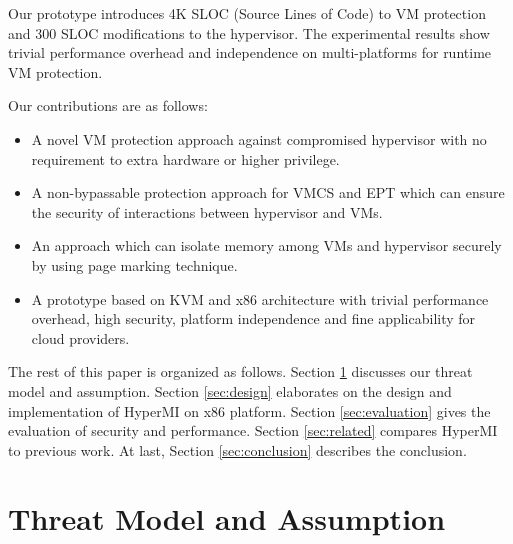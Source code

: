 \documentclass[conference]{IEEEtran}
\begin{document}
Our prototype introduces 4K SLOC (Source Lines of Code) to VM protection and 300 SLOC modifications to the hypervisor.
The experimental results show trivial performance overhead and independence on multi-platforms for runtime VM protection. 


Our contributions are as follows:
\begin{itemize}
\item{A novel VM protection approach against compromised hypervisor with no requirement to extra hardware or higher privilege.} 

\item{A non-bypassable protection approach for VMCS and EPT which can ensure the security of interactions between hypervisor and VMs.}
\item{An approach which can isolate memory among VMs and hypervisor securely by using page marking technique.}%

\item{A prototype based on KVM and x86 architecture with trivial performance overhead, high security, platform independence and fine applicability  for cloud providers.}

\end{itemize}
The rest of this paper is organized as follows. Section \ref{sec:threat} discusses our threat model and assumption. Section \ref{sec:design} elaborates on the design and implementation of HyperMI on x86 platform. Section \ref{sec:evaluation} gives the evaluation of security and performance. Section \ref{sec:related} compares HyperMI to previous work. At last, Section \ref{sec:conclusion} describes the conclusion.
 



\section{Threat Model and Assumption}\label{sec:threat}
\end{document}
